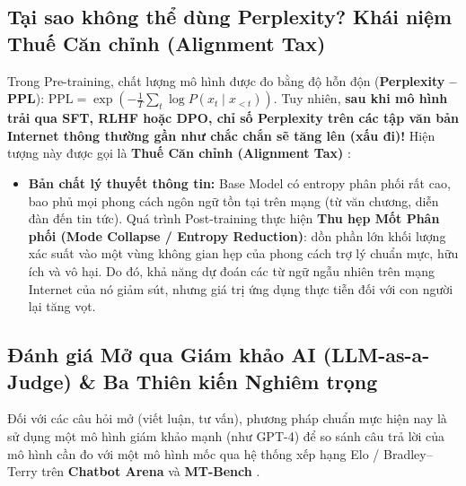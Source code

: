 \subsection{Tại sao không thể dùng Perplexity? Khái niệm Thuế Căn chỉnh (Alignment Tax)}
Trong Pre-training, chất lượng mô hình được đo bằng độ hỗn độn (\textbf{Perplexity -- PPL}): $\text{PPL} = \exp\left(-\frac{1}{T}\sum_t \log P(x_t \mid x_{<t})\right)$.
Tuy nhiên, \textbf{sau khi mô hình trải qua SFT, RLHF hoặc DPO, chỉ số Perplexity trên các tập văn bản Internet thông thường gần như chắc chắn sẽ tăng lên (xấu đi)!}
Hiện tượng này được gọi là \textbf{Thuế Căn chỉnh (Alignment Tax)} \citep{ouyang2022training, bai2022training}:
\begin{itemize}[leftmargin=1.2cm]
    \item \textbf{Bản chất lý thuyết thông tin:} Base Model có entropy phân phối rất cao, bao phủ mọi phong cách ngôn ngữ tồn tại trên mạng (từ văn chương, diễn đàn đến tin tức). Quá trình Post-training thực hiện \textbf{Thu hẹp Mốt Phân phối (Mode Collapse / Entropy Reduction)}: dồn phần lớn khối lượng xác suất vào một vùng không gian hẹp của phong cách trợ lý chuẩn mực, hữu ích và vô hại. Do đó, khả năng dự đoán các từ ngữ ngẫu nhiên trên mạng Internet của nó giảm sút, nhưng giá trị ứng dụng thực tiễn đối với con người lại tăng vọt.
\end{itemize}

\subsection{Đánh giá Mở qua Giám khảo AI (LLM-as-a-Judge) \& Ba Thiên kiến Nghiêm trọng}
Đối với các câu hỏi mở (viết luận, tư vấn), phương pháp chuẩn mực hiện nay là sử dụng một mô hình giám khảo mạnh (như GPT-4) để so sánh câu trả lời của mô hình cần đo với một mô hình mốc qua hệ thống xếp hạng Elo / Bradley--Terry trên \textbf{Chatbot Arena} \citep{chiang2024chatbot} và \textbf{MT-Bench} \citep{zheng2023judging}.

